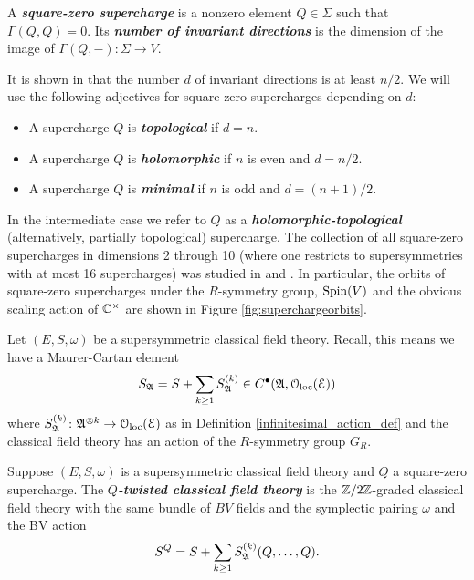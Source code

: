 \documentclass[10pt, oneside]{article}
\newcommand{\defterm}[1]{\textbf{\emph{#1}}}
\begin{document}
\begin{definition}
A \defterm{square-zero supercharge} is a nonzero element $Q\in\Sigma$ such that $\Gamma(Q, Q)=0$. Its \defterm{number of invariant directions} is the dimension of the image of $\Gamma(Q, -)\colon \Sigma\rightarrow V$.
\end{definition}

It is shown in \cite[Proposition 3.25]{ElliottSafronov} that the number $d$ of invariant directions is at least $n/2$. We will use the following adjectives for square-zero supercharges depending on $d$:
\begin{itemize}
\item A supercharge $Q$ is \defterm{topological} if $d = n$.

\item A supercharge $Q$ is \defterm{holomorphic} if $n$ is even and $d=n/2$.

\item A supercharge $Q$ is \defterm{minimal} if $n$ is odd and $d=(n+1)/2$.
\end{itemize}

In the intermediate case we refer to $Q$ as a \defterm{holomorphic-topological} (alternatively, partially topological) supercharge. The collection of all square-zero supercharges in dimensions 2 through 10 (where one restricts to supersymmetries with at most 16 supercharges) was studied in \cite{ElliottSafronov} and \cite{EagerSaberiWalcher}. In particular, the orbits of square-zero supercharges under the $R$-symmetry group, $\mathrm{Spin}(V)$ and the obvious scaling action of $\mathbb C^\times$ are shown in Figure \ref{fig:superchargeorbits}.

Let $(E, S, \omega)$ be a supersymmetric classical field theory. Recall, this means we have a Maurer-Cartan element 
\[
S_{\mathfrak A} = S + \sum_{k \geq 1} S_{\mathfrak A}^{(k)} \in C^\bullet(\mathfrak A, \mathcal{O}_{\rm loc}(\mathcal E))
\]
where $S_{\mathfrak A}^{(k)}\colon \mathfrak A^{\otimes k} \to \mathcal{O}_{\rm loc}(\mathcal E)$ as in Definition \ref{infinitesimal_action_def} and the classical field theory has an action of the $R$-symmetry group $G_R$.

\begin{definition} \label{def:twisting}
Suppose $(E, S, \omega)$ is a supersymmetric classical field theory and $Q$ a square-zero supercharge. The \defterm{$Q$-twisted classical field theory} is the $\mathbb Z/2\mathbb Z$-graded classical field theory with the same bundle of $BV$ fields and the symplectic pairing $\omega$ and the BV action
\[S^Q = S + \sum_{k \geq 1} S_{\mathfrak A}^{(k)}(Q, \dots, Q).\]
\end{definition}
\end{document}
